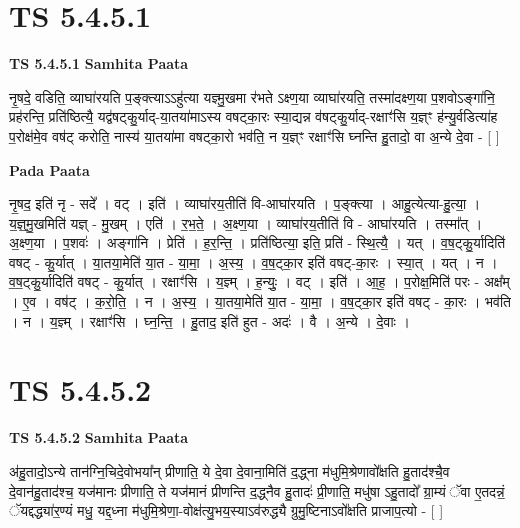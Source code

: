 \documentclass[17pt]{extarticle}
\begin{document}

\section{ TS 5.4.5.1 }

\textbf{TS 5.4.5.1 } \newline
\textbf{Samhita Paata} \newline

नृ॒षदे॒ वडिति॒ व्याघा॑रयति प॒ङ्क्त्याऽऽहु॑त्या यज्ञ्मु॒खमा र॑भते ऽक्ष्ण॒या व्याघा॑रयति॒ तस्मा॑दक्ष्ण॒या प॒शवोऽङ्गा॑नि॒ प्रह॑रन्ति॒ प्रति॑ष्ठित्यै॒ यद्व॑षट्कु॒र्याद्-या॒तया॑माऽस्य वषट्का॒रः स्या॒द्यन्न व॑षट्कु॒र्याद्-रक्षाꣳ॑सि य॒ज्ञ्ꣳ ह॑न्यु॒र्वडित्या॑ह प॒रोक्ष॑मे॒व वष॑ट् करोति॒ नास्य॑ या॒तया॑मा वषट्का॒रो भव॑ति॒ न य॒ज्ञ्ꣳ रक्षाꣳ॑सि घ्नन्ति हु॒तादो॒ वा अ॒न्ये दे॒वा - [  ] \newline

\textbf{Pada Paata} \newline

नृ॒षद॒ इति॑ नृ - सदे᳚ । वट् । इति॑ । व्याघा॑रय॒तीति॑ वि-आघा॑रयति । प॒ङ्क्त्या । आहु॒त्येत्या-हु॒त्या॒ । य॒ज्ञ्॒मु॒खमिति॑ यज्ञ् - मु॒खम् । एति॑ । र॒भ॒ते॒ । अ॒क्ष्ण॒या । व्याघा॑रय॒तीति॑ वि - आघा॑रयति । तस्मा᳚त् । अ॒क्ष्ण॒या । प॒शवः॑ । अङ्गा॑नि । प्रेति॑ । ह॒र॒न्ति॒ । प्रति॑ष्ठित्या॒ इति॒ प्रति॑ - स्थि॒त्यै॒ । यत् । व॒ष॒ट्कु॒र्यादिति॑ वषट् - कु॒र्यात् । या॒तया॒मेति॑ या॒त - या॒मा॒ । अ॒स्य॒ । व॒ष॒ट्का॒र इति॑ वषट्-का॒रः । स्या॒त् । यत् । न । व॒ष॒ट्कु॒र्यादिति॑ वषट् - कु॒र्यात् । रक्षाꣳ॑सि । य॒ज्ञ्म् । ह॒न्युः॒ । वट् । इति॑ । आ॒ह॒ । प॒रोक्ष॒मिति॑ परः - अक्ष᳚म् । ए॒व । वष॑ट् । क॒रो॒ति॒ । न । अ॒स्य॒ । या॒तया॒मेति॑ या॒त - या॒मा॒ । व॒ष॒ट्का॒र इति॑ वषट् - का॒रः । भव॑ति । न । य॒ज्ञ्म् । रक्षाꣳ॑सि । घ्न॒न्ति॒ । हु॒ताद॒ इति॑ हुत - अदः॑ । वै । अ॒न्ये । दे॒वाः ।  \newline





\section{ TS 5.4.5.2 }

\textbf{TS 5.4.5.2 } \newline
\textbf{Samhita Paata} \newline

अ॑हु॒तादो॒ऽन्ये तान॑ग्नि॒चिदे॒वोभया᳚न् प्रीणाति॒ ये दे॒वा दे॒वाना॒मिति॑ द॒द्ध्ना म॑धुमि॒श्रेणावो᳚क्षति हु॒ताद॑श्चै॒व दे॒वान॑हु॒ताद॑श्च॒ यज॑मानः प्रीणाति॒ ते यज॑मानं प्रीणन्ति द॒द्ध्नैव हु॒तादः॑ प्री॒णाति॒ मधु॑षा ऽहु॒तादो᳚ ग्रा॒म्यं ॅवा ए॒तदन्नं॒ ॅयद्दद्ध्या॑र॒ण्यं मधु॒ यद्द॒ध्ना म॑धुमि॒श्रेणा॒-वोक्ष॑त्यु॒भय॒स्याऽव॑रुद्ध्यै ग्रुमु॒ष्टिनाऽवो᳚क्षति प्राजाप॒त्यो - [  ] \newline
\end{document}
